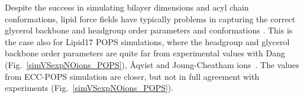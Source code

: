 \documentclass[journal=jpcbfk,manuscript=article]{achemso}
\begin{document}
%

Despite the success in simulating bilayer dimensions and acyl chain conformations,
lipid force fields have typically problems in capturing the correct glycerol backbone and
headgroup order parameters and conformations \cite{botan15,ollila16,NMRlipidsIV}.
This is the case also for Lipid17 POPS simulations, where the headgroup and glycerol backbone
order parameters are quite far from experimental values with Dang (Fig.~\ref{simVSexpNOions_POPS}),
{\AA}qvist and Joung-Cheatham ions~\cite{NMRlipidsIV}. The values from ECC-POPS simulation are closer,
but not in full agreement with experiments (Fig.~\ref{simVSexpNOions_POPS}).


%
\end{document}
